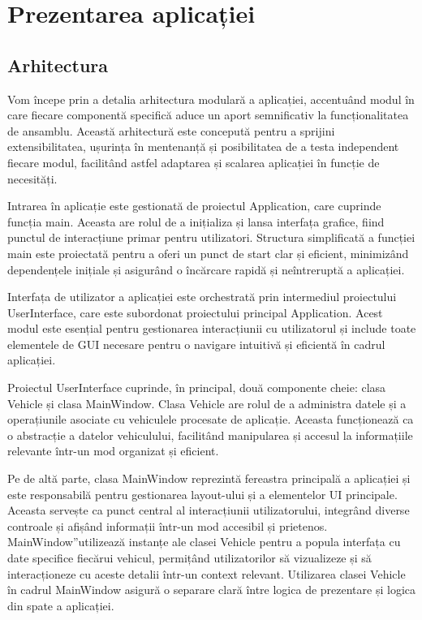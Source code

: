 \documentclass[a4paper,12pt]{report}
\begin{document}
\chapter{Prezentarea aplicației}
\section{Arhitectura}
Vom începe prin a detalia arhitectura modulară a aplicației, accentuând modul în care fiecare componentă specifică aduce un aport semnificativ la funcționalitatea de ansamblu. Această arhitectură este concepută pentru a sprijini extensibilitatea, ușurința în mentenanță și posibilitatea de a testa independent fiecare modul, facilitând astfel adaptarea și scalarea aplicației în funcție de necesități.

Intrarea în aplicație este gestionată de proiectul Application, care cuprinde funcția main. Aceasta are rolul de a inițializa și lansa interfața grafice, fiind punctul de interacțiune primar pentru utilizatori. Structura simplificată a funcției main este proiectată pentru a oferi un punct de start clar și eficient, minimizând dependențele inițiale și asigurând o încărcare rapidă și neîntreruptă a aplicației.

Interfața de utilizator a aplicației este orchestrată prin intermediul proiectului UserInterface, care este subordonat proiectului principal Application. Acest modul este esențial pentru gestionarea interacțiunii cu utilizatorul și include toate elementele de GUI necesare pentru o navigare intuitivă și eficientă în cadrul aplicației.

Proiectul UserInterface cuprinde, în principal, două componente cheie: clasa Vehicle și clasa MainWindow. Clasa Vehicle are rolul de a administra datele și a operațiunile asociate cu vehiculele procesate de aplicație. Aceasta funcționează ca o abstracție a datelor vehiculului, facilitând manipularea și accesul la informațiile relevante într-un mod organizat și eficient.

Pe de altă parte, clasa MainWindow reprezintă fereastra principală a aplicației și este responsabilă pentru gestionarea layout-ului și a elementelor UI principale. Aceasta servește ca punct central al interacțiunii utilizatorului, integrând diverse controale și afișând informații într-un mod accesibil și prietenos. MainWindow”utilizează instanțe ale clasei Vehicle pentru a popula interfața cu date specifice fiecărui vehicul, permițând utilizatorilor să vizualizeze și să interacționeze cu aceste detalii într-un context relevant. Utilizarea clasei Vehicle în cadrul MainWindow asigură o separare clară între logica de prezentare și logica din spate a aplicației.
\end{document}
